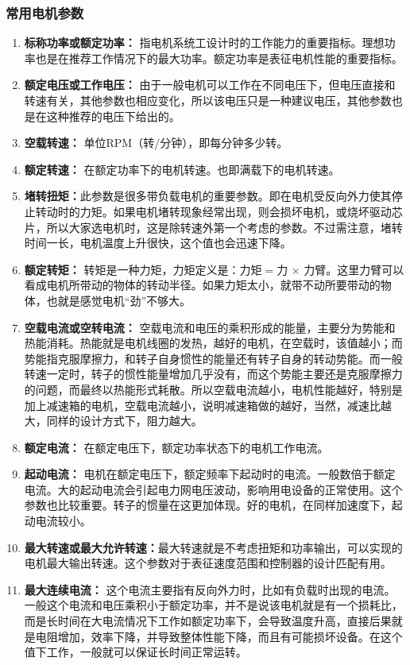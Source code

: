 \documentclass[UTF8]{article} %
\begin{document}
\subsubsection{常用电机参数}
\begin{enumerate}
  \item \textbf{标称功率或额定功率：} 指电机系统工设计时的工作能力的重要指标。理想功率也是在推荐工作情况下的最大功率。额定功率是表征电机性能的重要指标。
  \item \textbf{额定电压或工作电压：} 由于一般电机可以工作在不同电压下，但电压直接和转速有关，其他参数也相应变化，所以该电压只是一种建议电压，其他参数也是在这种推荐的电压下给出的。
  \item \textbf{空载转速：} 单位RPM（转/分钟），即每分钟多少转。
  \item \textbf{额定转速：} 在额定功率下的电机转速。也即满载下的电机转速。
  \item \textbf{堵转扭矩：}此参数是很多带负载电机的重要参数。即在电机受反向外力使其停止转动时的力矩。如果电机堵转现象经常出现，则会损坏电机，或烧坏驱动芯片，所以大家选电机时，这是除转速外第一个考虑的参数。不过需注意，堵转时间一长，电机温度上升很快，这个值也会迅速下降。
  \item \textbf{额定转矩：} 转矩是一种力矩，力矩定义是：力矩$ = $力 $ \times $ 力臂。这里力臂可以看成电机所带动的物体的转动半径。如果力矩太小，就带不动所要带动的物体，也就是感觉电机“劲”不够大。
  \item \textbf{空载电流或空转电流：} 空载电流和电压的乘积形成的能量，主要分为势能和热能消耗。热能就是电机线圈的发热，越好的电机，在空载时，该值越小；而势能指克服摩擦力，和转子自身惯性的能量还有转子自身的转动势能。而一般转速一定时，转子的惯性能量增加几乎没有，而这个势能主要还是克服摩擦力的问题，而最终以热能形式耗散。所以空载电流越小，电机性能越好，特别是加上减速箱的电机，空载电流越小，说明减速箱做的越好，当然，减速比越大，同样的设计方式下，阻力越大。
  \item \textbf{额定电流：} 在额定电压下，额定功率状态下的电机工作电流。
  \item \textbf{起动电流：} 电机在额定电压下，额定频率下起动时的电流。一般数倍于额定电流。大的起动电流会引起电力网电压波动，影响用电设备的正常使用。这个参数也比较重要。转子的惯量在这更加体现。好的电机，在同样加速度下，起动电流较小。
  \item \textbf{最大转速或最大允许转速：}最大转速就是不考虑扭矩和功率输出，可以实现的电机最大输出转速。这个参数对于表征速度范围和控制器的设计匹配有用。
  \item \textbf{最大连续电流：} 这个电流主要指有反向外力时，比如有负载时出现的电流。一般这个电流和电压乘积小于额定功率，并不是说该电机就是有一个损耗比，而是长时间在大电流情况下工作如额定功率下，会导致温度升高，直接后果就是电阻增加，效率下降，并导致整体性能下降，而且有可能损坏设备。在这个值下工作，一般就可以保证长时间正常运转。

\end{enumerate}
\end{document}
